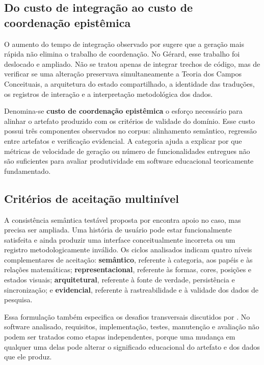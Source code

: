 \documentclass[preprint,12pt,authoryear]{elsarticle}
\newcommand{\gerard}{Gérard\xspace}
\begin{document}
\subsection{Do custo de integração ao custo de coordenação epistêmica}
O aumento do tempo de integração observado por \citet{song2024impact} sugere que a geração mais rápida não elimina o trabalho de coordenação. No \gerard, esse trabalho foi deslocado e ampliado. Não se tratou apenas de integrar trechos de código, mas de verificar se uma alteração preservava simultaneamente a Teoria dos Campos Conceituais, a arquitetura do estado compartilhado, a identidade das traduções, os registros de interação e a interpretação metodológica dos dados.

Denomina-se \textbf{custo de coordenação epistêmica} o esforço necessário para alinhar o artefato produzido com os critérios de validade do domínio. Esse custo possui três componentes observados no corpus: alinhamento semântico, regressão entre artefatos e verificação evidencial. A categoria ajuda a explicar por que métricas de velocidade de geração ou número de funcionalidades entregues não são suficientes para avaliar produtividade em software educacional teoricamente fundamentado.

\subsection{Critérios de aceitação multinível}
A consistência semântica testável proposta por \citet{zhang2024agilegen} encontra apoio no caso, mas precisa ser ampliada. Uma história de usuário pode estar funcionalmente satisfeita e ainda produzir uma interface conceitualmente incorreta ou um registro metodologicamente inválido. Os ciclos analisados indicam quatro níveis complementares de aceitação: \textbf{semântico}, referente à categoria, aos papéis e às relações matemáticas; \textbf{representacional}, referente às formas, cores, posições e estados visuais; \textbf{arquitetural}, referente à fonte de verdade, persistência e sincronização; e \textbf{evidencial}, referente à rastreabilidade e à validade dos dados de pesquisa.

Essa formulação também especifica os desafios transversais discutidos por \citet{gao2024challenges}. No software analisado, requisitos, implementação, testes, manutenção e avaliação não podem ser tratados como etapas independentes, porque uma mudança em qualquer uma delas pode alterar o significado educacional do artefato e dos dados que ele produz.
\end{document}
